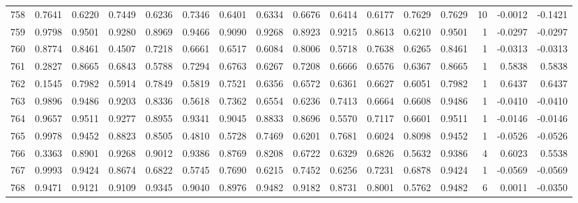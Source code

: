 \begin{tabular}{lrrrrrrrrrrrrrrr}
758 &      0.7641 &  0.6220 &  0.7449 &  0.6236 &  0.7346 &  0.6401 &  0.6334 &  0.6676 &  0.6414 &  0.6177 &   0.7629 &     0.7629 &     10 &                   -0.0012 &                    -0.1421 \\
759 &      0.9798 &  0.9501 &  0.9280 &  0.8969 &  0.9466 &  0.9090 &  0.9268 &  0.8923 &  0.9215 &  0.8613 &   0.6210 &     0.9501 &      1 &                   -0.0297 &                    -0.0297 \\
760 &      0.8774 &  0.8461 &  0.4507 &  0.7218 &  0.6661 &  0.6517 &  0.6084 &  0.8006 &  0.5718 &  0.7638 &   0.6265 &     0.8461 &      1 &                   -0.0313 &                    -0.0313 \\
761 &      0.2827 &  0.8665 &  0.6843 &  0.5788 &  0.7294 &  0.6763 &  0.6267 &  0.7208 &  0.6666 &  0.6576 &   0.6367 &     0.8665 &      1 &                    0.5838 &                     0.5838 \\
762 &      0.1545 &  0.7982 &  0.5914 &  0.7849 &  0.5819 &  0.7521 &  0.6356 &  0.6572 &  0.6361 &  0.6627 &   0.6051 &     0.7982 &      1 &                    0.6437 &                     0.6437 \\
763 &      0.9896 &  0.9486 &  0.9203 &  0.8336 &  0.5618 &  0.7362 &  0.6554 &  0.6236 &  0.7413 &  0.6664 &   0.6608 &     0.9486 &      1 &                   -0.0410 &                    -0.0410 \\
764 &      0.9657 &  0.9511 &  0.9277 &  0.8955 &  0.9341 &  0.9045 &  0.8833 &  0.8696 &  0.5570 &  0.7117 &   0.6601 &     0.9511 &      1 &                   -0.0146 &                    -0.0146 \\
765 &      0.9978 &  0.9452 &  0.8823 &  0.8505 &  0.4810 &  0.5728 &  0.7469 &  0.6201 &  0.7681 &  0.6024 &   0.8098 &     0.9452 &      1 &                   -0.0526 &                    -0.0526 \\
766 &      0.3363 &  0.8901 &  0.9268 &  0.9012 &  0.9386 &  0.8769 &  0.8208 &  0.6722 &  0.6329 &  0.6826 &   0.5632 &     0.9386 &      4 &                    0.6023 &                     0.5538 \\
767 &      0.9993 &  0.9424 &  0.8674 &  0.6822 &  0.5745 &  0.7690 &  0.6215 &  0.7452 &  0.6256 &  0.7231 &   0.6878 &     0.9424 &      1 &                   -0.0569 &                    -0.0569 \\
768 &      0.9471 &  0.9121 &  0.9109 &  0.9345 &  0.9040 &  0.8976 &  0.9482 &  0.9182 &  0.8731 &  0.8001 &   0.5762 &     0.9482 &      6 &                    0.0011 &                    -0.0350 \\

\end{tabular}
